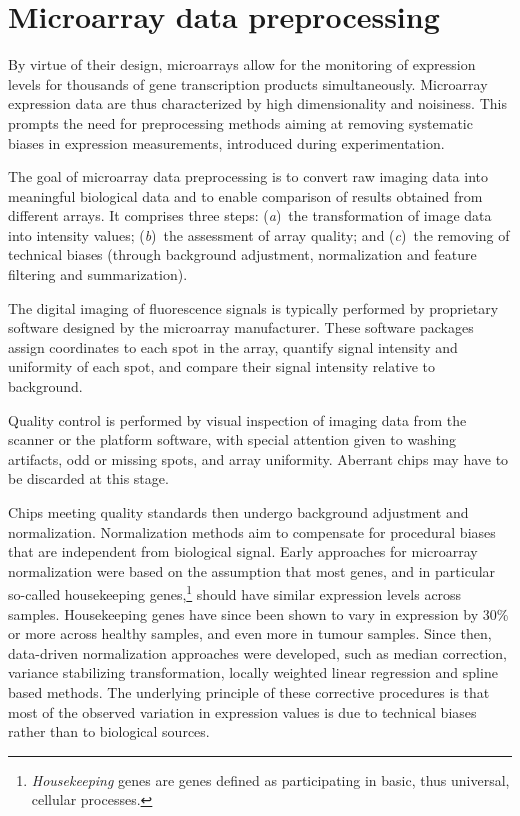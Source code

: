 \section{Microarray data preprocessing}
\label{sec:microarray-methods-data-preprocessing}

By virtue of their design, microarrays allow for the monitoring of expression
levels for thousands of gene transcription products simultaneously.  Microarray
expression data are thus characterized by high dimensionality and noisiness.
This prompts the need for preprocessing methods aiming at removing systematic
biases in expression measurements, introduced during
experimentation.\cite{shakya_comparison_2010}

The goal of microarray data preprocessing is to convert raw imaging data into
meaningful biological data and to enable comparison of results obtained from
different arrays.  It comprises three steps: (\emph{a})~the transformation of
image data into intensity values; (\emph{b})~the assessment of array quality;
and (\emph{c})~the removing of technical biases (through background adjustment,
normalization and feature filtering and summarization).

The digital imaging of fluorescence signals is typically performed by
proprietary software designed by the microarray manufacturer.  These software
packages assign coordinates to each spot in the array, quantify signal intensity
and uniformity of each spot, and compare their signal intensity relative to
background.

Quality control is performed by visual inspection of imaging data from the
scanner or the platform software, with special attention given to washing
artifacts, odd or missing spots, and array uniformity.  Aberrant chips may have
to be discarded at this stage.

Chips meeting quality standards then undergo background adjustment and
normalization.  Normalization methods aim to compensate for procedural biases
that are independent from biological signal.  Early approaches for microarray
normalization were based on the assumption that most genes, and in particular
so-called housekeeping genes,\footnote{\emph{Housekeeping} genes are genes
  defined as participating in basic, thus universal, cellular processes.}
should have similar expression levels across samples.  Housekeeping genes have
since been shown to vary in expression by 30\% or more across healthy samples,
and even more in tumour samples.\cite{lee_control_2002,eisenberg_human_2003}
Since then, data-driven normalization approaches were developed, such as median
correction,\cite{cho_genome-wide_1998,selinger_rna_2000} variance stabilizing
transformation,\cite{durbin_variance-stabilizing_2002} locally weighted linear
regression\cite{yang_normalization_2002} and spline based
methods.\cite{workman_new_2002} The underlying principle of these corrective
procedures is that most of the observed variation in expression values is due to
technical biases rather than to biological sources.\cite{hicks_when_2014}

